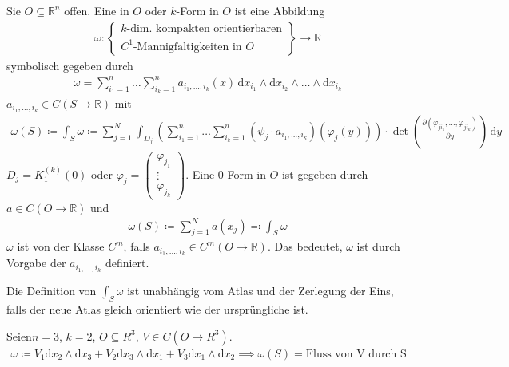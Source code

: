 \documentclass[a4paper,10pt]{scrbook}
\begin{document}
\begin{theorem}[Definition] \label{thm:12.4}
  Sie $O \subseteq \mathbb{R}^n$ offen. Eine  in $O$ oder $k$-Form in $O$ ist eine Abbildung
  \begin{align*}
    \omega : \left\{
      \begin{gathered}
        \text{$k$-dim. kompakten orientierbaren} \\
        \text{$C^1$-Mannigfaltigkeiten in $O$}
      \end{gathered}
    \right\}
    \to \mathbb{R}
  \end{align*}
  symbolisch gegeben durch
  \begin{align*}
    \omega = \sum\limits_{i_1 = 1}^{n} \ldots \sum\limits_{i_k = 1}^{n} a_{i_1 ,\ldots, i_k} (x) \, \mathrm{d}x_{i_1} \wedge \mathrm{d}x_{i_2} \wedge \ldots \wedge \mathrm{d}x_{i_k}
  \end{align*}
  $a_{i_1 ,\ldots, i_k} \in C(S \to \mathbb{R})$ mit
  \begin{align*}
    \omega(S) \coloneq \int_S \omega \coloneq \sum\limits_{j=1}^{N} \int_{D_j} \left( \sum\limits_{i_1 = 1}^{n} \ldots \sum\limits_{i_k = 1}^{n} (\psi_j \cdot a_{i_1 ,\ldots, i_k})(\varphi_j(y)) \right) \cdot \det\left( \frac{\partial (\varphi_{ji_1},\ldots,\varphi_{ji_k})}{\partial y} \right) \, \mathrm{d}y
  \end{align*}
  $D_j = K_1^{(k)}(0)$ oder $\varphi_j = \left(\begin{smallmatrix} \varphi_{j_1} \\ \vdots \\ \varphi_{j_k} \end{smallmatrix}\right)$. Eine $0$-Form in $O$ ist gegeben durch $a \in C(O \to \mathbb{R})$ und
  \begin{align*}
    \omega(S) \coloneq \sum\limits_{j=1}^{N} a(x_j) \eqcolon \int_S \omega
  \end{align*}
  $\omega$ ist von der Klasse $C^m$, falls $a_{i_1 ,\ldots, i_k} \in C^m(O \to \mathbb{R})$. Das bedeutet, $\omega$ ist durch Vorgabe der $a_{i_1 ,\ldots, i_k}$ definiert.
\end{theorem}

\begin{notice} \label{thm:12.5}
  Die Definition von $\int_S \omega$ ist unabhängig vom Atlas und der Zerlegung der Eins, falls der neue Atlas gleich orientiert wie der ursprüngliche ist.
\end{notice}

\begin{example} \label{thm:12.6}
  Seien$n=3$, $k=2$, $O \subseteq R^3$, $V \in C(O \to R^3)$.
  \begin{align*}
    \omega \coloneq V_1 \mathrm{d}x_2 \wedge \mathrm{d}x_3 + V_2 \mathrm{d}x_3 \wedge \mathrm{d}x_1 + V_3 \mathrm{d}x_1 \wedge \mathrm{d}x_2 \implies \omega(S)=\text{Fluss von V durch S}
  \end{align*}
\end{example}
\end{document}
